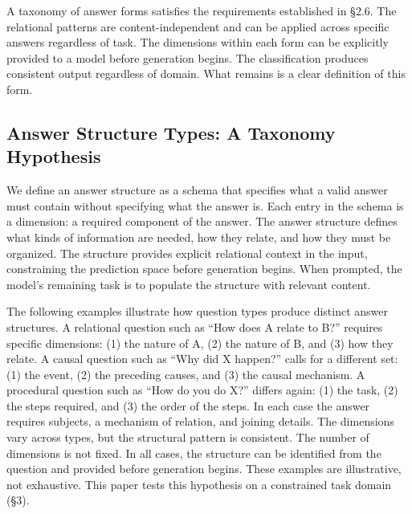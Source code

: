 \documentclass{article}
\begin{document}
A taxonomy of answer forms satisfies the requirements established in \S2.6. The relational patterns are content-independent and can be applied across specific answers regardless of task. The dimensions within each form can be explicitly provided to a model before generation begins. The classification produces consistent output regardless of domain. What remains is a clear definition of this form.

\subsection{Answer Structure Types: A Taxonomy Hypothesis}

We define an answer structure as a schema that specifies what a valid answer must contain without specifying what the answer is. Each entry in the schema is a dimension: a required component of the answer. The answer structure defines what kinds of information are needed, how they relate, and how they must be organized. The structure provides explicit relational context in the input, constraining the prediction space before generation begins. When prompted, the model's remaining task is to populate the structure with relevant content.

The following examples illustrate how question types produce distinct answer structures. A relational question such as ``How does A relate to B?'' requires specific dimensions: (1) the nature of A, (2) the nature of B, and (3) how they relate. A causal question such as ``Why did X happen?'' calls for a different set: (1) the event, (2) the preceding causes, and (3) the causal mechanism. A procedural question such as ``How do you do X?'' differs again: (1) the task, (2) the steps required, and (3) the order of the steps. In each case the answer requires subjects, a mechanism of relation, and joining details. The dimensions vary across types, but the structural pattern is consistent. The number of dimensions is not fixed. In all cases, the structure can be identified from the question and provided before generation begins. These examples are illustrative, not exhaustive. This paper tests this hypothesis on a constrained task domain (\S3).
\end{document}
